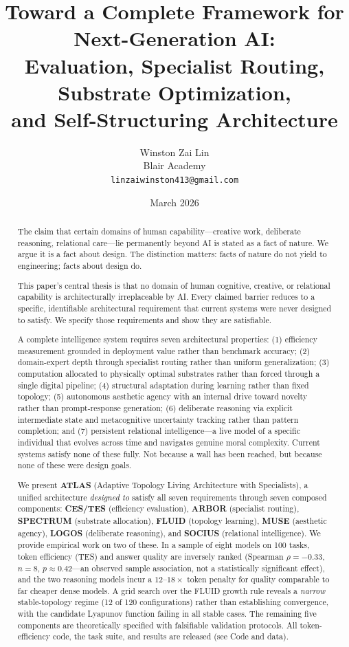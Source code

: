 \documentclass[12pt]{article}
\title{\textbf{Toward a Complete Framework for Next-Generation AI:\\
Evaluation, Specialist Routing, Substrate Optimization,\\
and Self-Structuring Architecture}}
\author{
    Winston Zai Lin \\
    \small Blair Academy \\
    \small \texttt{linzaiwinston413@gmail.com}
}
\date{March 2026}
\begin{document}
\maketitle

\begin{abstract}
The claim that certain domains of human capability---creative work, deliberate reasoning, relational care---lie permanently beyond AI is stated as a fact of nature. We argue it is a fact about design. The distinction matters: facts of nature do not yield to engineering; facts about design do.

This paper's central thesis is that no domain of human cognitive, creative, or relational capability is architecturally irreplaceable by AI. Every claimed barrier reduces to a specific, identifiable architectural requirement that current systems were never designed to satisfy. We specify those requirements and show they are satisfiable.

A complete intelligence system requires seven architectural properties: (1) efficiency measurement grounded in deployment value rather than benchmark accuracy; (2) domain-expert depth through specialist routing rather than uniform generalization; (3) computation allocated to physically optimal substrates rather than forced through a single digital pipeline; (4) structural adaptation during learning rather than fixed topology; (5) autonomous aesthetic agency with an internal drive toward novelty rather than prompt-response generation; (6) deliberate reasoning via explicit intermediate state and metacognitive uncertainty tracking rather than pattern completion; and (7) persistent relational intelligence---a live model of a specific individual that evolves across time and navigates genuine moral complexity. Current systems satisfy none of these fully. Not because a wall has been reached, but because none of these were design goals.

We present \textbf{ATLAS} (Adaptive Topology Living Architecture with Specialists), a unified architecture \emph{designed to} satisfy all seven requirements through seven composed components: \textbf{CES/TES} (efficiency evaluation), \textbf{ARBOR} (specialist routing), \textbf{SPECTRUM} (substrate allocation), \textbf{FLUID} (topology learning), \textbf{MUSE} (aesthetic agency), \textbf{LOGOS} (deliberate reasoning), and \textbf{SOCIUS} (relational intelligence). We provide empirical work on two of these. In a sample of eight models on 100 tasks, token efficiency (TES) and answer quality are inversely ranked (Spearman $\rho = -0.33$, $n=8$, $p \approx 0.42$---an observed sample association, not a statistically significant effect), and the two reasoning models incur a $12$--$18\times$ token penalty for quality comparable to far cheaper dense models. A grid search over the FLUID growth rule reveals a \emph{narrow} stable-topology regime (12 of 120 configurations) rather than establishing convergence, with the candidate Lyapunov function failing in all stable cases. The remaining five components are theoretically specified with falsifiable validation protocols. All token-efficiency code, the task suite, and results are released (see Code and data).
\end{abstract}
\end{document}
